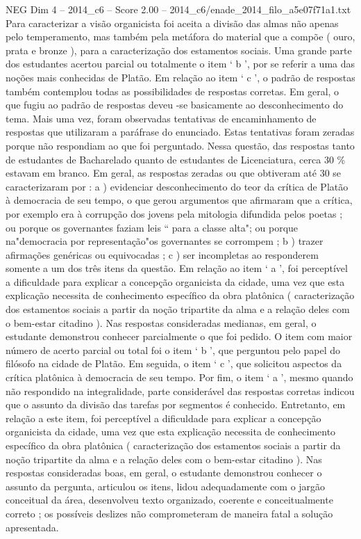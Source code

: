 \begin{textsample}{NEG Dim 4 – 2014\_c6 – Score 2.00 – 2014\_c6/enade\_2014\_filo\_a5e07f71a1.txt}
Para caracterizar a visão organicista foi aceita a divisão das almas não apenas pelo temperamento, mas também pela metáfora do material que a compõe ( ouro, prata e bronze ), para a caracterização dos estamentos sociais.
Uma grande parte dos estudantes acertou parcial ou totalmente o item ‘ b ’, por se referir a uma das noções mais conhecidas de Platão.
Em relação ao item ‘ c ’, o padrão de respostas também contemplou todas as possibilidades de respostas corretas.
Em geral, o que fugiu ao padrão de respostas deveu -se basicamente ao desconhecimento do tema.
Mais uma vez, foram observadas tentativas de encaminhamento de respostas que utilizaram a paráfrase do enunciado.
Estas tentativas foram zeradas porque não respondiam ao que foi perguntado.
Nessa questão, das respostas tanto de estudantes de Bacharelado quanto de estudantes de Licenciatura, cerca 30 \% estavam em branco.
Em geral, as respostas zeradas ou que obtiveram até 30 se caracterizaram por : a ) evidenciar desconhecimento do teor da crítica de Platão à democracia de seu tempo, o que gerou argumentos que afirmaram que a crítica, por exemplo era à corrupção dos jovens pela mitologia difundida pelos poetas ; ou porque os governantes faziam leis “ para a classe alta"; ou porque na"democracia por representação"os governantes se corrompem ; b ) trazer afirmações genéricas ou equivocadas ; c ) ser incompletas ao responderem somente a um dos três itens da questão.
Em relação ao item ‘ a ’, foi perceptível a dificuldade para explicar a concepção organicista da cidade, uma vez que esta explicação necessita de conhecimento específico da obra platônica ( caracterização dos estamentos sociais a partir da noção tripartite da alma e a relação deles com o bem-estar citadino ).
Nas respostas consideradas medianas, em geral, o estudante demonstrou conhecer parcialmente o que foi pedido.
O item com maior número de acerto parcial ou total foi o item ‘ b ’, que perguntou pelo papel do filósofo na cidade de Platão.
Em seguida, o item ‘ c ’, que solicitou aspectos da crítica platônica à democracia de seu tempo.
Por fim, o item ‘ a ’, mesmo quando não respondido na integralidade, parte considerável das respostas corretas indicou que o assunto da divisão das tarefas por segmentos é conhecido.
Entretanto, em relação a este item, foi perceptível a dificuldade para explicar a concepção organicista da cidade, uma vez que esta explicação necessita de conhecimento específico da obra platônica ( caracterização dos estamentos sociais a partir da noção tripartite da alma e a relação deles com o bem-estar citadino ).
Nas respostas consideradas boas, em geral, o estudante demonstrou conhecer o assunto da pergunta, articulou os itens, lidou adequadamente com o jargão conceitual da área, desenvolveu texto organizado, coerente e conceitualmente correto ; os possíveis deslizes não comprometeram de maneira fatal a solução apresentada.

\end{textsample}
